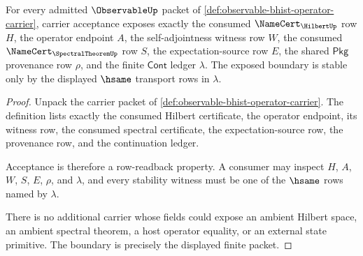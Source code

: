 \begin{theorem}
\label{thm:observable-hilbert-spectral-boundary}
For every admitted $\ObservableUp$ packet of
\autoref{def:observable-bhist-operator-carrier}, carrier acceptance exposes
exactly the consumed $\NameCert_{\HilbertUp}$ row $H$, the operator endpoint
$A$, the self-adjointness witness row $W$, the consumed
$\NameCert_{\SpectralTheoremUp}$ row $S$, the expectation-source row $E$, the
shared $\mathsf{Pkg}$ provenance row $\rho$, and the finite $\mathsf{Cont}$
ledger $\lambda$. The exposed boundary is stable only by the displayed
$\hsame$ transport rows in $\lambda$.
\end{theorem}
\begin{proof}
Unpack the carrier packet of
\autoref{def:observable-bhist-operator-carrier}. The definition lists exactly
the consumed Hilbert certificate, the operator endpoint, its witness row, the
consumed spectral certificate, the expectation-source row, the provenance
row, and the continuation ledger.

Acceptance is therefore a row-readback property. A consumer may inspect $H$,
$A$, $W$, $S$, $E$, $\rho$, and $\lambda$, and every stability witness must be
one of the $\hsame$ rows named by $\lambda$.

There is no additional carrier whose fields could expose an ambient Hilbert
space, an ambient spectral theorem, a host operator equality, or an external
state primitive. The boundary is precisely the displayed finite packet.
\end{proof}

